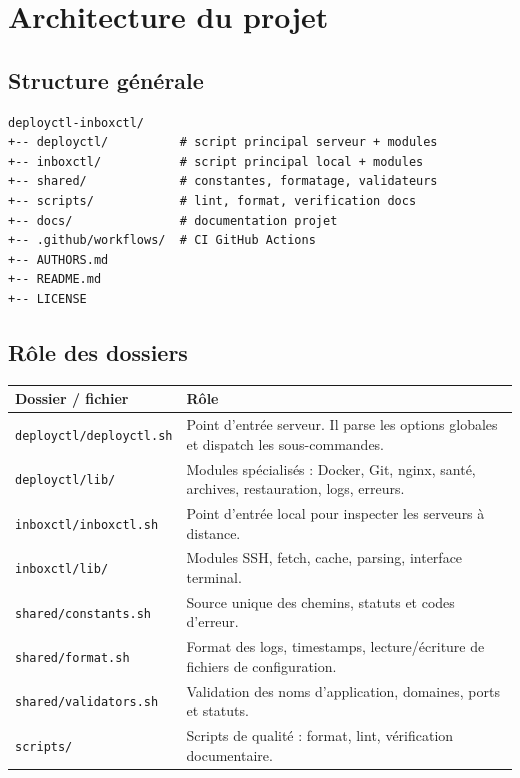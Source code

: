 \documentclass[12pt,a4paper]{article}
\begin{document}
\section{Architecture du projet}

\subsection{Structure générale}

\begin{lstlisting}
deployctl-inboxctl/
+-- deployctl/          # script principal serveur + modules
+-- inboxctl/           # script principal local + modules
+-- shared/             # constantes, formatage, validateurs
+-- scripts/            # lint, format, verification docs
+-- docs/               # documentation projet
+-- .github/workflows/  # CI GitHub Actions
+-- AUTHORS.md
+-- README.md
+-- LICENSE
\end{lstlisting}

\subsection{Rôle des dossiers}

\begin{longtable}{p{}p{}}
\toprule
\textbf{Dossier / fichier} & \textbf{Rôle} \\
\midrule
\texttt{deployctl/deployctl.sh} & Point d'entrée serveur. Il parse les options globales et dispatch les sous-commandes. \\
\texttt{deployctl/lib/} & Modules spécialisés : Docker, Git, nginx, santé, archives, restauration, logs, erreurs. \\
\texttt{inboxctl/inboxctl.sh} & Point d'entrée local pour inspecter les serveurs à distance. \\
\texttt{inboxctl/lib/} & Modules SSH, fetch, cache, parsing, interface terminal. \\
\texttt{shared/constants.sh} & Source unique des chemins, statuts et codes d'erreur. \\
\texttt{shared/format.sh} & Format des logs, timestamps, lecture/écriture de fichiers de configuration. \\
\texttt{shared/validators.sh} & Validation des noms d'application, domaines, ports et statuts. \\
\texttt{scripts/} & Scripts de qualité : format, lint, vérification documentaire. \\
\bottomrule
\end{longtable}
\end{document}
